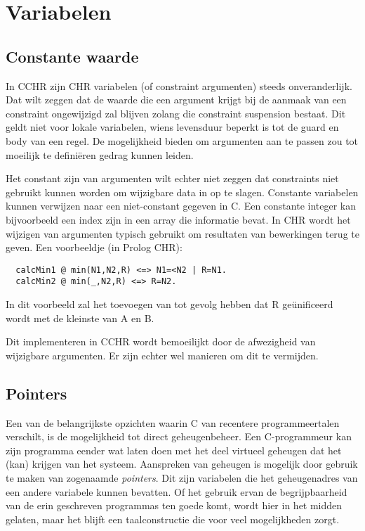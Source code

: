 \section{Variabelen} \label{sec:taal-var}

\subsection{Constante waarde}

In CCHR zijn CHR variabelen (of constraint argumenten) steeds onveranderlijk. Dat wilt zeggen dat de waarde die een argument krijgt bij de aanmaak van een constraint ongewijzigd zal blijven zolang die constraint suspension bestaat. Dit geldt niet voor lokale variabelen, wiens levensduur beperkt is tot de guard en body van een regel. De mogelijkheid bieden om argumenten aan te passen zou tot moeilijk te defini\"eren gedrag kunnen leiden.

Het constant zijn van argumenten wilt echter niet zeggen dat constraints niet gebruikt kunnen worden om wijzigbare data in op te slagen. Constante variabelen kunnen verwijzen naar een niet-constant gegeven in C. Een constante integer kan bijvoorbeeld een index zijn in een array die informatie bevat. In CHR wordt het wijzigen van argumenten typisch gebruikt om resultaten van bewerkingen terug te geven. Een voorbeeldje (in Prolog CHR):
\begin{Verbatim}
  calcMin1 @ min(N1,N2,R) <=> N1=<N2 | R=N1.
  calcMin2 @ min(_,N2,R) <=> R=N2.
\end{Verbatim}
In dit voorbeeld zal het toevoegen van  tot gevolg hebben dat R ge\"unificeerd wordt met de kleinste van A en B.

Dit implementeren in CCHR wordt bemoeilijkt door de afwezigheid van wijzigbare argumenten. Er zijn echter wel manieren om dit te vermijden.

\subsection{Pointers}

Een van de belangrijkste opzichten waarin C van recentere programmeertalen verschilt, is de mogelijkheid tot direct geheugenbeheer. Een C-programmeur kan zijn programma eender wat laten doen met het deel virtueel geheugen dat het (kan) krijgen van het systeem. Aanspreken van geheugen is mogelijk door gebruik te maken van zogenaamde {\em pointers}. Dit zijn variabelen die het geheugenadres van een andere variabele kunnen bevatten. Of het gebruik ervan de begrijpbaarheid van de erin geschreven programmas ten goede komt, wordt hier in het midden gelaten, maar het blijft een taalconstructie die voor veel mogelijkheden zorgt.

